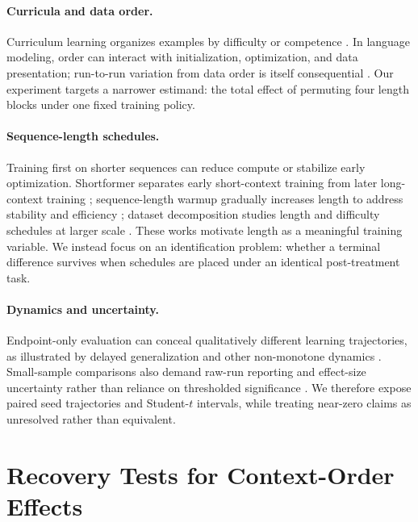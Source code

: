 \documentclass{article}
\begin{document}
\paragraph{Curricula and data order.}
Curriculum learning organizes examples by difficulty or competence \citep{bengio2009curriculum,zhou2021curriculum}. In language modeling, order can interact with initialization, optimization, and data presentation; run-to-run variation from data order is itself consequential \citep{dodge2020finetuning}. Our experiment targets a narrower estimand: the total effect of permuting four length blocks under one fixed training policy.

\paragraph{Sequence-length schedules.}
Training first on shorter sequences can reduce compute or stabilize early optimization. Shortformer separates early short-context training from later long-context training \citep{press2021shortformer}; sequence-length warmup gradually increases length to address stability and efficiency \citep{li2022slw}; dataset decomposition studies length and difficulty schedules at larger scale \citep{pouransari2024dataset}. These works motivate length as a meaningful training variable. We instead focus on an identification problem: whether a terminal difference survives when schedules are placed under an identical post-treatment task.

\paragraph{Dynamics and uncertainty.}
Endpoint-only evaluation can conceal qualitatively different learning trajectories, as illustrated by delayed generalization and other non-monotone dynamics \citep{power2022grokking}. Small-sample comparisons also demand raw-run reporting and effect-size uncertainty rather than reliance on thresholded significance \citep{agarwal2021precipice,ho2019estimation}. We therefore expose paired seed trajectories and Student-$t$ intervals, while treating near-zero claims as unresolved rather than equivalent.

\section{Recovery Tests for Context-Order Effects}
\end{document}
